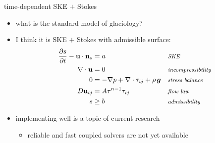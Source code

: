 \documentclass[10pt,dvipsnames]{beamer}
\newcommand{\mcomm}[1]{\text{\footnotesize \hfill \emph{#1}}}  %
\begin{document}
\begin{frame}{time-dependent SKE $+$ Stokes}

\begin{itemize}
\item what is the \alert{standard model} of glaciology?
\item I think it is \alert{SKE $+$ Stokes with admissible surface}:
\begin{align*}
\frac{\partial s}{\partial t} - \mathbf{u} \cdot \mathbf{n}_s &= a && \mcomm{SKE} \\
\nabla \cdot \mathbf{u} &= 0 && \mcomm{incompressibility} \\
0 &= - \nabla p + \nabla \cdot \tau_{ij} + \rho\, \bm{g} && \mcomm{stress balance} \\
D\mathbf{u}_{ij} &= A \tau^{n-1} \tau_{ij} && \mcomm{flow law} \\
s &\ge b && \mcomm{admissibility}
\end{align*}
\item implementing well is a topic of current research
  \begin{itemize}
  \item[$\circ$] reliable and fast coupled solvers are not yet available
  \end{itemize}
\end{itemize}
\end{frame}
\end{document}
